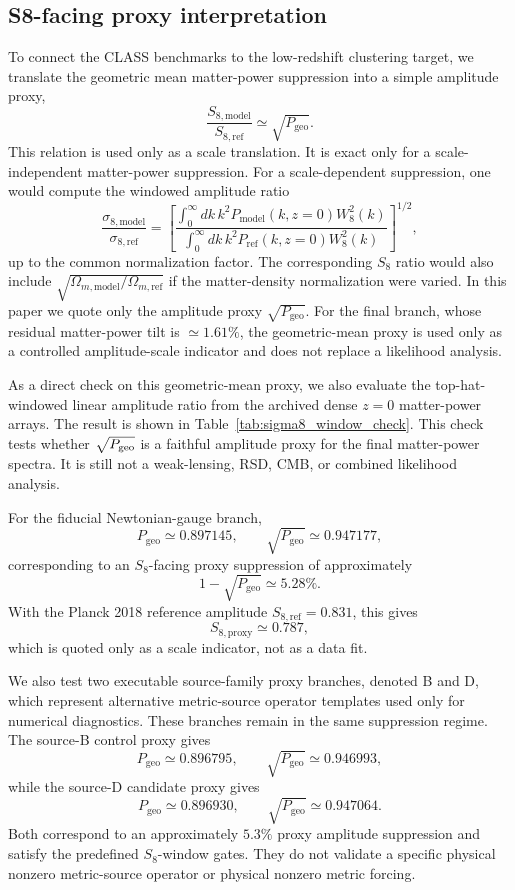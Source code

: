 ﻿\documentclass[11pt,prd,preprint,nofootinbib,amsmath,amssymb]{revtex4-2}
\begin{document}
\subsection{S8-facing proxy interpretation}
\label{sec:s8_proxy}

To connect the CLASS benchmarks to the low-redshift clustering
target, we translate the geometric mean matter-power suppression into a simple
amplitude proxy,
\[
\frac{S_{8,\mathrm{model}}}{S_{8,\mathrm{ref}}}
\simeq
\sqrt{P_{\mathrm{geo}}}.
\]
This relation is used only as a scale translation. It is exact only for a
scale-independent matter-power suppression. For a scale-dependent suppression,
one would compute the windowed amplitude ratio
\[
\frac{\sigma_{8,\mathrm{model}}}{\sigma_{8,\mathrm{ref}}}
=
\left[
\frac{
\int_0^\infty dk\,k^2 P_{\mathrm{model}}(k,z=0)W_8^2(k)
}{
\int_0^\infty dk\,k^2 P_{\mathrm{ref}}(k,z=0)W_8^2(k)
}
\right]^{1/2},
\]
up to the common normalization factor. The corresponding $S_8$ ratio would
also include $\sqrt{\Omega_{m,\mathrm{model}}/\Omega_{m,\mathrm{ref}}}$ if
the matter-density normalization were varied. In this paper we quote only the
amplitude proxy $\sqrt{P_{\mathrm{geo}}}$. For the final branch, whose residual matter-power tilt is
$\simeq1.61\%$, the geometric-mean proxy is used only as a controlled
amplitude-scale indicator and does not replace a likelihood analysis.

As a direct check on this geometric-mean proxy, we also evaluate the
top-hat-windowed linear amplitude ratio from the archived dense $z=0$
matter-power arrays. The result is shown in
Table~\ref{tab:sigma8_window_check}. This check tests whether
$\sqrt{P_{\rm geo}}$ is a faithful amplitude proxy for the final matter-power
spectra. It is still not a weak-lensing, RSD, CMB, or combined likelihood
analysis.

\FloatBarrier

\FloatBarrier

For the fiducial Newtonian-gauge branch,
\[
P_{\mathrm{geo}}\simeq0.897145,
\qquad
\sqrt{P_{\mathrm{geo}}}\simeq0.947177,
\]
corresponding to an $S_8$-facing proxy suppression of approximately
\[
1-\sqrt{P_{\mathrm{geo}}}\simeq5.28\%.
\]
With the Planck 2018 reference amplitude $S_{8,\mathrm{ref}}=0.831$, this gives
\[
S_{8,\mathrm{proxy}}\simeq0.787,
\]
which is quoted only as a scale indicator, not as a data fit.

We also test two executable source-family proxy branches, denoted B and D,
which represent alternative metric-source operator templates used only for
numerical diagnostics. These branches remain in the same suppression regime.
The source-B control proxy gives
\[
P_{\mathrm{geo}}\simeq0.896795,
\qquad
\sqrt{P_{\mathrm{geo}}}\simeq0.946993,
\]
while the source-D candidate proxy gives
\[
P_{\mathrm{geo}}\simeq0.896930,
\qquad
\sqrt{P_{\mathrm{geo}}}\simeq0.947064.
\]
Both correspond to an approximately $5.3\%$ proxy amplitude suppression and
satisfy the predefined $S_8$-window gates. They do not validate a specific
physical nonzero metric-source operator or physical nonzero metric forcing.
\end{document}
